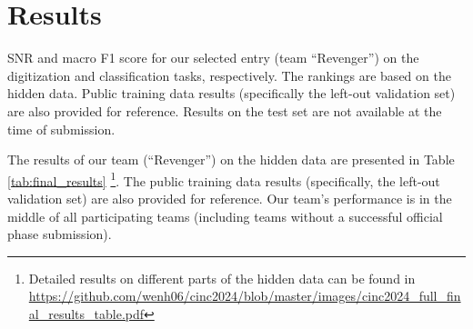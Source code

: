 \section{Results}
\label{sec:results}

\begin{table}[!htp]
\centering

\caption{SNR and macro F1 score for our selected entry (team ``Revenger'') on the digitization and classification tasks, respectively. The rankings are based on the hidden data. Public training data results (specifically the left-out validation set) are also provided for reference. Results on the test set are not available at the time of submission.}
\label{tab:final_results}
\end{table}

The results of our team (``Revenger'') on the hidden data are presented in Table \ref{tab:final_results} \footnote{Detailed results on different parts of the hidden data can be found in \url{https://github.com/wenh06/cinc2024/blob/master/images/cinc2024_full_final_results_table.pdf}}. The public training data results (specifically, the left-out validation set) are also provided for reference. Our team's performance is in the middle of all participating teams (including teams without a successful official phase submission).
